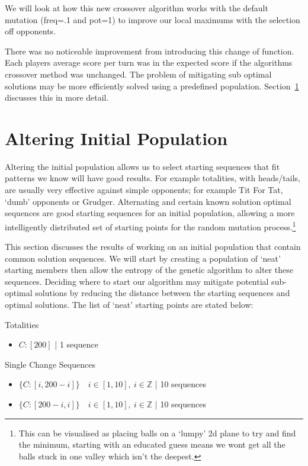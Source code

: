 We will look at how this new crossover algorithm works with the default mutation (freq=.1 and pot=1) to improve our local maximums with the selection off opponents.

There was no noticeable improvement from introducing this change of function.
Each players average score per turn was in the expected score if the algorithms crossover method was unchanged.
The problem of mitigating sub optimal solutions may be more efficiently solved using a predefined population.
Section~\ref{sec:alteringinitialpopulation} discusses this in more detail.

\section{Altering Initial Population}\label{sec:alteringinitialpopulation}
Altering the initial population allows us to select starting sequences that fit patterns we know will have good results.
For example totalities, with heads/tails, are usually very effective against simple opponents;
for example Tit For Tat, `dumb' opponents or Grudger.
Alternating and certain known solution optimal sequences are good starting sequences for an initial population, allowing a more intelligently distributed set of starting points for the random mutation process.\footnote{This can be visualised as placing balls on a `lumpy' 2d plane to try and find the minimum, starting with an educated guess means we wont get all the balls stuck in one valley which isn't the deepest.}

This section discusses the results of working on an initial population that contain common solution sequences.
We will start by creating a population of `neat' starting members then allow the entropy of the genetic algorithm to alter these sequences.
Deciding where to start our algorithm may mitigate potential sub-optimal solutions by reducing the distance between the starting sequences and optimal solutions.
The list of `neat' starting points are stated below:

Totalities
\begin{itemize}
    \item \(C:[200]\) | 1 sequence
\end{itemize}

Single Change Sequences
\begin{itemize}
    \item \(\{C:[i,200-i]\} \quad i\in [1,10],\ i \in \mathbb{Z}\) | 10 sequences
    \item \(\{C:[200-i,i]\} \quad i\in [1,10],\ i \in \mathbb{Z}\) | 10 sequences
\end{itemize}

